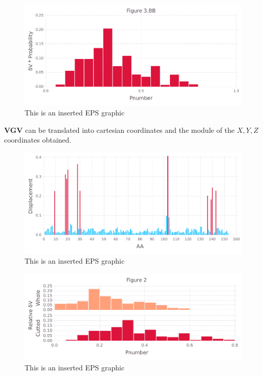 \documentclass[10pt,letterpaper]{article}
\begin{document}
\begin{figure}[ht]
\begin{center}
\includegraphics[scale=0.5]{256l/3bbfigure_hi-precision.pdf}
\caption{This is an inserted EPS graphic}
\label{fig11}
\end{center}
\end{figure}

\FloatBarrier


\textbf{VGV} can be translated into cartesian coordinates and the module of the \(X, Y, Z\) coordinates obtained.

\begin{figure}[ht]
\begin{center}
\includegraphics[scale=0.5]{256l/5figure_hi-precision.pdf}
\caption{This is an inserted EPS graphic}
\label{fig13}
\end{center}
\end{figure}
              
\begin{figure}[ht]
\begin{center}
\includegraphics[scale=0.5]{256l/3both_figure_hi-precision.pdf}
\caption{This is an inserted EPS graphic}
\label{fig13}
\end{center}
\end{figure}
\end{document}
